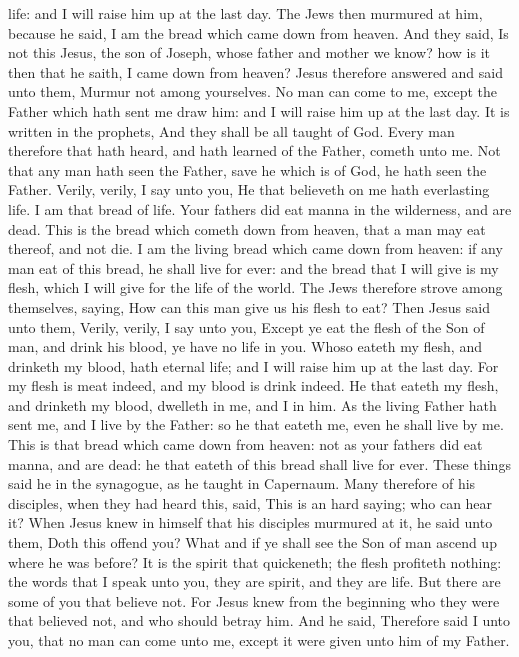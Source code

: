 life: and I will raise him up at the last day.  The Jews
then murmured at him, because he said, I am the bread which came down
from heaven.  And they said, Is not this Jesus, the son of
Joseph, whose father and mother we know? how is it then that he saith, I
came down from heaven?  Jesus therefore answered and said
unto them, Murmur not among yourselves.  No man can come to
me, except the Father which hath sent me draw him: and I will raise him
up at the last day.  It is written in the prophets, And
they shall be all taught of God. Every man therefore that hath heard,
and hath learned of the Father, cometh unto me.  Not that
any man hath seen the Father, save he which is of God, he hath seen the
Father.  Verily, verily, I say unto you, He that believeth
on me hath everlasting life.  I am that bread of life.
 Your fathers did eat manna in the wilderness, and are
dead.  This is the bread which cometh down from heaven,
that a man may eat thereof, and not die.  I am the living
bread which came down from heaven: if any man eat of this bread, he
shall live for ever: and the bread that I will give is my flesh, which I
will give for the life of the world.  The Jews therefore
strove among themselves, saying, How can this man give us his flesh to
eat?  Then Jesus said unto them, Verily, verily, I say unto
you, Except ye eat the flesh of the Son of man, and drink his blood, ye
have no life in you.  Whoso eateth my flesh, and drinketh
my blood, hath eternal life; and I will raise him up at the last day.
 For my flesh is meat indeed, and my blood is drink indeed.
 He that eateth my flesh, and drinketh my blood, dwelleth
in me, and I in him.  As the living Father hath sent me,
and I live by the Father: so he that eateth me, even he shall live by
me.  This is that bread which came down from heaven: not as
your fathers did eat manna, and are dead: he that eateth of this bread
shall live for ever.  These things said he in the
synagogue, as he taught in Capernaum.  Many therefore of
his disciples, when they had heard this, said, This is an hard saying;
who can hear it?  When Jesus knew in himself that his
disciples murmured at it, he said unto them, Doth this offend you?
 What and if ye shall see the Son of man ascend up where he
was before?  It is the spirit that quickeneth; the flesh
profiteth nothing: the words that I speak unto you, they are spirit, and
they are life.  But there are some of you that believe not.
For Jesus knew from the beginning who they were that believed not, and
who should betray him.  And he said, Therefore said I unto
you, that no man can come unto me, except it were given unto him of my
Father.

